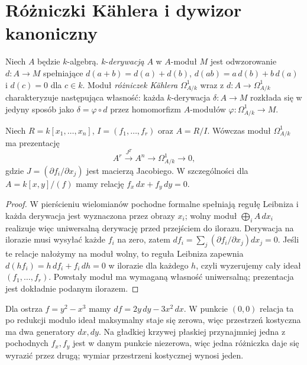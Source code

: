 \section{Różniczki Kählera i dywizor kanoniczny}
\label{sec:differentials}

\begin{definicja}
Niech $A$ będzie $k$-algebrą. $k$-\emph{derywacją}
$A$ w $A$-moduł $M$ jest odwzorowanie
$d:A\to M$ spełniające $d(a+b)=d(a)+d(b)$,
$d(ab)=a\,d(b)+b\,d(a)$ i $d(c)=0$ dla $c\in k$.
Moduł \emph{różniczek Kählera} $\Omega^1_{A/k}$
wraz z $d:A\to\Omega^1_{A/k}$ charakteryzuje
następująca własność: każda $k$-derywacja
$\delta:A\to M$ rozkłada się w jedyny sposób
jako $\delta=\varphi\circ d$ przez homomorfizm
$A$-modułów $\varphi:\Omega^1_{A/k}\to M$.
\end{definicja}

\begin{stwierdzenie}
\label{st:kahler}
Niech $R=k[x_1,\ldots,x_n]$, $I=(f_1,\ldots,f_r)$
oraz $A=R/I$. Wówczas moduł $\Omega^1_{A/k}$ ma prezentację
\[
 A^r\xrightarrow{J^T}A^n\longrightarrow
 \Omega^1_{A/k}\longrightarrow0,
\]
gdzie $J=(\partial f_i/\partial x_j)$ jest
macierzą Jacobiego. W szczególności dla
$A=k[x,y]/(f)$ mamy relację $f_x\,dx+f_y\,dy=0$.
\end{stwierdzenie}
\begin{proof}
W pierścieniu wielomianów pochodne formalne
spełniają regułę Leibniza i każda derywacja
jest wyznaczona przez obrazy $x_i$;
wolny moduł $\bigoplus_i A\,dx_i$ realizuje więc
uniwersalną derywację przed przejściem do ilorazu.
Derywacja na ilorazie musi wysyłać każde $f_i$
na zero, zatem $df_i=\sum_j(\partial f_i/\partial x_j)dx_j=0$.
Jeśli te relacje nałożymy na moduł wolny,
to reguła Leibniza zapewnia $d(hf_i)=h\,df_i+f_i\,dh=0$
w ilorazie dla każdego $h$, czyli wyzerujemy
cały ideał $(f_1,\ldots,f_r)$. Powstały moduł
ma wymaganą własność uniwersalną; prezentacja
jest dokładnie podanym ilorazem.
\end{proof}

\begin{przyklad}
Dla ostrza $f=y^2-x^3$ mamy
$df=2y\,dy-3x^2\,dx$. W punkcie $(0,0)$
relacja ta po redukcji modulo ideał maksymalny
staje się zerowa, więc przestrzeń kostyczna
ma dwa generatory $dx,dy$. Na gładkiej krzywej
płaskiej przynajmniej jedna z pochodnych $f_x,f_y$
jest w danym punkcie niezerowa, więc jedna
różniczka daje się wyrazić przez drugą;
wymiar przestrzeni kostycznej wynosi jeden.
\end{przyklad}

